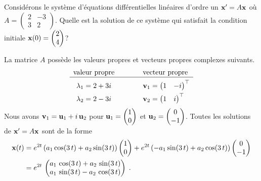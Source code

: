{\begin{egg}
Considérons le système d'équations différentielles linéaires d'ordre un
$\mathbf{x}' = A\mathbf{x}$ où
$\displaystyle A = \begin{pmatrix} 2 & -3 \\ 3 & 2 \end{pmatrix}$.
Quelle est la solution de ce système qui satisfait la condition initiale
$\displaystyle \mathbf{x}(0) = \begin{pmatrix} 2 \\ 4 \end{pmatrix}$?

La matrice $A$ possède les valeurs propres et vecteurs propres complexes
suivants.
\[
\begin{array}{ccl}
\text{valeur propre} & \hspace*{2em} & \text{vecteur propre} \\
\hline
\rule{0pt}{1.5em} \lambda_1 = 2+3i & &
\VEC{v}_1 = \begin{pmatrix} 1 & -i \end{pmatrix}^\top \\[0.4em]
\lambda_2 = 2-3i & & \VEC{v}_2 = \begin{pmatrix} 1 & i \end{pmatrix}^\top
\end{array}
\]
Nous avons $\mathbf{v}_1 = \mathbf{u}_1 + i \, \mathbf{u}_2$ pour
$\displaystyle \mathbf{u}_1 = \begin{pmatrix} 1 \\ 0 \end{pmatrix}$
et $\displaystyle \mathbf{u}_2 = \begin{pmatrix} 0 \\ -1 \end{pmatrix}$.
Toutes les solutions de $\mathbf{x}'= A \mathbf{x}$ sont de la forme
\begin{align*}
\VEC{x}(t) &
= e^{2t}\left( a_1 \cos(3\,t) + a_2 \sin(3\,t) \right)
\begin{pmatrix} 1 \\ 0 \end{pmatrix}
+ e^{2t}\left( -a_1 \sin(3\,t) + a_2 \cos(3\,t) \right)
\begin{pmatrix} 0 \\ -1 \end{pmatrix} \\
&= e^{2t}\, \begin{pmatrix}
a_1\,\cos(3\,t) + a_2\,\sin(3\,t) \\
a_1\,\sin(3\,t) - a_2\,\cos(3\,t)
\end{pmatrix} \; .

\end{align*}
\end{egg}}
